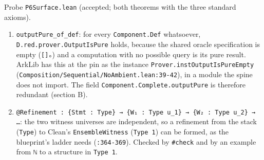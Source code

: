 Probe \texttt{P6Surface.\allowbreak{}lean} (accepted; both theorems with the three standard axioms).

\begin{enumerate}
\item \texttt{outputPure\_\allowbreak{}of\_\allowbreak{}def}: for every \texttt{Component.\allowbreak{}Def} whatsoever, \texttt{D.\allowbreak{}red.\allowbreak{}prover.\allowbreak{}OutputIsPure} holds, because the shared oracle specification is empty (\texttt{[]ₒ}) and a computation with no possible query is its pure result. ArkLib has this at the pin as the instance \texttt{Prover.\allowbreak{}instOutputIsPureEmpty} (\texttt{C\allowbreak{}o\allowbreak{}m\allowbreak{}p\allowbreak{}o\allowbreak{}s\allowbreak{}i\allowbreak{}t\allowbreak{}i\allowbreak{}o\allowbreak{}n\allowbreak{}/\allowbreak{}S\allowbreak{}e\allowbreak{}q\allowbreak{}u\allowbreak{}e\allowbreak{}n\allowbreak{}t\allowbreak{}i\allowbreak{}a\allowbreak{}l\allowbreak{}/\allowbreak{}N\allowbreak{}o\allowbreak{}A\allowbreak{}m\allowbreak{}b\allowbreak{}i\allowbreak{}e\allowbreak{}n\allowbreak{}t\allowbreak{}.\allowbreak{}l\allowbreak{}e\allowbreak{}a\allowbreak{}n\allowbreak{}:\allowbreak{}3\allowbreak{}9\allowbreak{}-{}\allowbreak{}4\allowbreak{}2}), in a module the spine does not import. The field \texttt{C\allowbreak{}o\allowbreak{}m\allowbreak{}p\allowbreak{}o\allowbreak{}n\allowbreak{}e\allowbreak{}n\allowbreak{}t\allowbreak{}.\allowbreak{}C\allowbreak{}o\allowbreak{}m\allowbreak{}p\allowbreak{}l\allowbreak{}e\allowbreak{}t\allowbreak{}e\allowbreak{}.\allowbreak{}o\allowbreak{}u\allowbreak{}t\allowbreak{}p\allowbreak{}u\allowbreak{}t\allowbreak{}P\allowbreak{}u\allowbreak{}r\allowbreak{}e} is therefore redundant (section B).
\item \texttt{@\allowbreak{}R\allowbreak{}e\allowbreak{}f\allowbreak{}i\allowbreak{}n\allowbreak{}e\allowbreak{}m\allowbreak{}e\allowbreak{}n\allowbreak{}t\allowbreak{} :\allowbreak{} \{\allowbreak{}S\allowbreak{}t\allowbreak{}m\allowbreak{}t\allowbreak{} :\allowbreak{} T\allowbreak{}y\allowbreak{}p\allowbreak{}e\allowbreak{}\}\allowbreak{} →\allowbreak{} \{\allowbreak{}W\allowbreak{}₁\allowbreak{} :\allowbreak{} T\allowbreak{}y\allowbreak{}p\allowbreak{}e\allowbreak{} u\allowbreak{}\_\allowbreak{}1\allowbreak{}\}\allowbreak{} →\allowbreak{} \{\allowbreak{}W\allowbreak{}₂\allowbreak{} :\allowbreak{} T\allowbreak{}y\allowbreak{}p\allowbreak{}e\allowbreak{} u\allowbreak{}\_\allowbreak{}2\allowbreak{}\}\allowbreak{} →\allowbreak{} …}: the two witness universes are independent, so a refinement from the stack (\texttt{Type}) to Clean's \texttt{EnsembleWitness} (\texttt{Type 1}) can be formed, as the blueprint's ladder needs (\texttt{:364-{}369}). Checked by \texttt{\#check} and by an example from \texttt{ℕ} to a structure in \texttt{Type 1}.

\end{enumerate}
